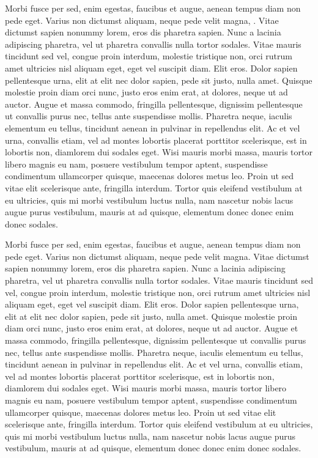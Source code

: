 \documentclass[12pt]{article}
\begin{document}
Morbi fusce per sed, enim egestas, faucibus et augue, aenean tempus diam non pede eget. Varius non dictumst aliquam, neque pede velit magna, \cite{ES}. Vitae dictumst sapien nonummy lorem, eros dis pharetra sapien. Nunc a lacinia adipiscing pharetra, vel ut pharetra convallis nulla tortor sodales. Vitae mauris tincidunt sed vel, congue proin interdum, molestie tristique non, orci rutrum amet ultricies nisl aliquam eget, eget vel suscipit diam. Elit eros. Dolor sapien pellentesque urna, elit at elit nec dolor sapien, pede sit justo, nulla amet. Quisque molestie proin diam orci nunc, justo eros enim erat, at dolores, neque ut ad auctor.
Augue et massa commodo, fringilla pellentesque, dignissim pellentesque ut convallis purus nec, tellus ante suspendisse mollis. Pharetra neque, iaculis elementum eu tellus, tincidunt aenean in pulvinar in repellendus elit. Ac et vel urna, convallis etiam, vel ad montes lobortis placerat porttitor scelerisque, est in lobortis non, diamlorem dui sodales eget. Wisi mauris morbi massa, mauris tortor libero magnis eu nam, posuere vestibulum tempor aptent, suspendisse condimentum ullamcorper quisque, maecenas dolores metus leo. Proin ut sed vitae elit scelerisque ante, fringilla interdum. Tortor quis eleifend vestibulum at eu ultricies, quis mi morbi vestibulum luctus nulla, nam nascetur nobis lacus augue purus vestibulum, mauris at ad quisque, elementum donec donec enim donec sodales.


Morbi fusce per sed, enim egestas, faucibus et augue, aenean tempus diam non pede eget. Varius non dictumst aliquam, neque pede velit magna. Vitae dictumst sapien nonummy lorem, eros dis pharetra sapien. Nunc a lacinia adipiscing pharetra, vel ut pharetra convallis nulla tortor sodales. Vitae mauris tincidunt sed vel, congue proin interdum, molestie tristique non, orci rutrum amet ultricies nisl aliquam eget, eget vel suscipit diam. Elit eros. Dolor sapien pellentesque urna, elit at elit nec dolor sapien, pede sit justo, nulla amet. Quisque molestie proin diam orci nunc, justo eros enim erat, at dolores, neque ut ad auctor.
Augue et massa commodo, fringilla pellentesque, dignissim pellentesque ut convallis purus nec, tellus ante suspendisse mollis. Pharetra neque, iaculis elementum eu tellus, tincidunt aenean in pulvinar in repellendus elit. Ac et vel urna, convallis etiam, vel ad montes lobortis placerat porttitor scelerisque, est in lobortis non, diamlorem dui sodales eget. Wisi mauris morbi massa, mauris tortor libero magnis eu nam, posuere vestibulum tempor aptent, suspendisse condimentum ullamcorper quisque, maecenas dolores metus leo. Proin ut sed vitae elit scelerisque ante, fringilla interdum. Tortor quis eleifend vestibulum at eu ultricies, quis mi morbi vestibulum luctus nulla, nam nascetur nobis lacus augue purus vestibulum, mauris at ad quisque, elementum donec donec enim donec sodales.
\end{document}

